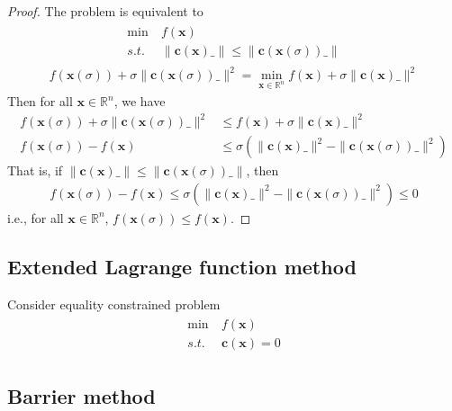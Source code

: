\begin{proof}
    The problem is equivalent to
    \begin{align}
        \begin{array}{ll}
            \min \ &f(\mathbf{x}) \\
            s.t. \ &\parallel \mathbf{c}
            (\mathbf{x})\_ \parallel \leq
            \parallel \mathbf{c}
            (\mathbf{x}(\sigma))\_ \parallel
        \end{array}
    \end{align}
    \begin{align}
        f(\mathbf{x}(\sigma)) + \sigma \parallel \mathbf{c}
        (\mathbf{x}(\sigma))\_ \parallel^2 = 
        \min_{\mathbf{x} \in \mathbb{R}^n}
        f(\mathbf{x}) + \sigma \parallel \mathbf{c}
        (\mathbf{x})\_ \parallel^2
    \end{align}
    Then for all $\mathbf{x} \in \mathbb{R}^n$, we have
    \begin{align}
        f(\mathbf{x}(\sigma)) + \sigma \parallel \mathbf{c}
        (\mathbf{x}(\sigma))\_ \parallel^2 &\leq 
        f(\mathbf{x}) + \sigma \parallel \mathbf{c}
        (\mathbf{x})\_ \parallel^2 \\
        f(\mathbf{x}(\sigma)) - f(\mathbf{x}) &\leq
        \sigma(\parallel \mathbf{c}
        (\mathbf{x})\_ \parallel^2 - \parallel \mathbf{c}
        (\mathbf{x}(\sigma))\_ \parallel^2)
    \end{align}
    That is, if $\parallel \mathbf{c}
    (\mathbf{x})\_ \parallel \leq \parallel \mathbf{c}
    (\mathbf{x}(\sigma))\_ \parallel$, then
    \begin{align}
        f(\mathbf{x}(\sigma)) - f(\mathbf{x}) \leq
        \sigma(\parallel \mathbf{c}
        (\mathbf{x})\_ \parallel^2 - \parallel \mathbf{c}
        (\mathbf{x}(\sigma))\_ \parallel^2) \leq 0
    \end{align}
    i.e., for all $\mathbf{x} \in \mathbb{R}^n$,
    $f(\mathbf{x}(\sigma)) \leq f(\mathbf{x})$.
    
\end{proof}
\subsection{Extended Lagrange function method}
Consider equality constrained problem
\begin{align}
    \begin{array}{ll}
        \min \ &f(\mathbf{x}) \\
        s.t. \ &\mathbf{c}(\mathbf{x}) = 0
    \end{array}
\end{align}
\subsection{Barrier method}
